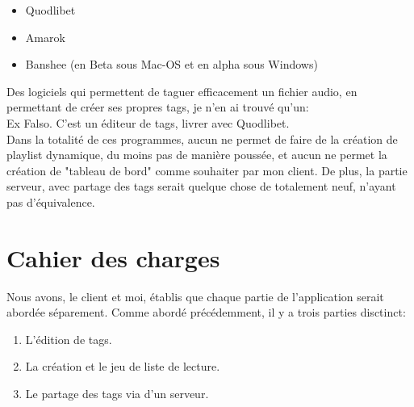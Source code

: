 \documentclass[a4paper,12pt]{report}
\begin{document}
\begin{itemize}
\item Quodlibet
\item Amarok
\item Banshee (en Beta sous Mac-OS et en alpha sous Windows)
\end{itemize}

Des logiciels qui permettent de taguer efficacement un fichier audio, en permettant de créer ses propres tags, je n'en ai trouvé qu'un:\\

Ex Falso.
C'est un éditeur de tags, livrer avec Quodlibet.\\

Dans la totalité de ces programmes, aucun ne permet de faire de la création de playlist dynamique, du moins pas de manière poussée, et aucun ne permet la création de "tableau de bord" comme souhaiter par mon client.
De plus, la partie serveur, avec partage des tags serait quelque chose de totalement neuf, n'ayant pas d'équivalence.

\chapter{Cahier des charges}

Nous avons, le client et moi, établis que chaque partie de l'application serait abordée séparement. Comme abordé précédemment, il y a trois parties disctinct:\\

\begin{enumerate}
\item L'édition de tags.
\item La création et le jeu de liste de lecture.
\item Le partage des tags via d'un serveur.
\end{enumerate}




\end{document}
